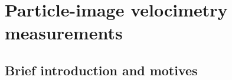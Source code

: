 \section{Particle-image velocimetry measurements}
\subsection{Brief introduction and motives}
\paragraph{}


 